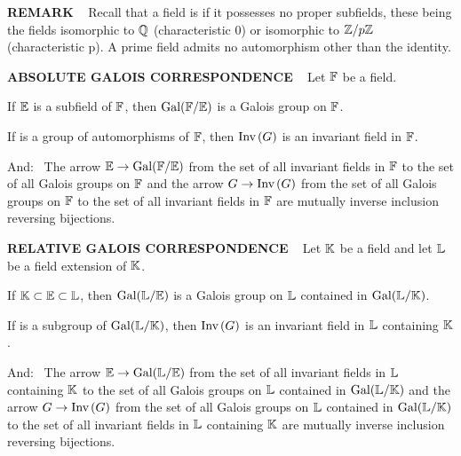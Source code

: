 \vspace{0.1cm}


\begin{x}{\small\bf REMARK} \ %
Recall that a field is 
if it possesses no proper subfields, these being the fields 
isomorphic to $\mathbb{Q}$ (characteristic 0) or 
isomorphic to $\mathbb{Z}/p\mathbb{Z}$ (characteristic p).  
A prime field admits no automorphism other than the identity.
\end{x}

\vspace{0.1cm}

\begin{x}{\small\bf ABSOLUTE GALOIS CORRESPONDENCE} \ %
Let $\mathbb{F}$ be a field.

\qquad \textbullet \quad If $\mathbb{E}$ is a subfield of $\mathbb{F}$, then $\text{Gal}(\mathbb{F}/\mathbb{E})$ is a Galois group on $\mathbb{F}$.

\vspace{0.1cm}

\qquad \textbullet \quad If \mG is a group of automorphisms of $\mathbb{F}$, then $\text{Inv}\hspace{0.05cm}(G)$ is an invariant field in $\mathbb{F}$.

\vspace{0.1cm}

And:  \ The arrow $\mathbb{E} \rightarrow \text{Gal}(\mathbb{F}/\mathbb{E})$ from the set of all invariant fields in $\mathbb{F}$ to the set of all Galois groups 
on $\mathbb{F}$ and the arrow $G \rightarrow \text{Inv}\hspace{0.05cm}(G)$ from the set of all Galois groups on $\mathbb{F}$ to the set of all invariant fields in $\mathbb{F}$ 
are mutually inverse inclusion reversing bijections. 
\end{x}

\vspace{0.1cm}


\begin{x}{\small\bf RELATIVE GALOIS CORRESPONDENCE} \ %
Let $\mathbb{K}$ be a field and let $\mathbb{L}$ be a field extension of $\mathbb{K}$.


\qquad \textbullet \quad If $\mathbb{K} \subset \mathbb{E} \subset \mathbb{L}$, then $\text{Gal}(\mathbb{L}/\mathbb{E})$ is a Galois group on $\mathbb{L}$ contained in 
$\text{Gal}(\mathbb{L}/\mathbb{K})$.

\vspace{0.1cm}

\qquad \textbullet \quad If \mG is a subgroup of $\text{Gal}(\mathbb{L}/\mathbb{K})$, then $\text{Inv}\hspace{0.05cm}(G)$ is an invariant field in $\mathbb{L}$ containing 
$\mathbb{K}$.

\vspace{0.1cm}

And: \ The arrow $\mathbb{E} \rightarrow \text{Gal}(\mathbb{L}/\mathbb{E})$ from the set of all invariant fields in $\mathbb{L}$ containing $\mathbb{K}$ to the set of all Galois 
groups on $\mathbb{L}$ contained in $\text{Gal}(\mathbb{L}/\mathbb{K})$ and the arrow $G \rightarrow \text{Inv}\hspace{0.05cm}(G)$ from the set of all Galois groups on $\mathbb{L}$ 
contained in $\text{Gal}(\mathbb{L}/\mathbb{K})$ to the set of all invariant fields in $\mathbb{L}$ containing $\mathbb{K}$ are mutually inverse inclusion reversing bijections. 


\end{x}

